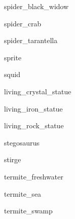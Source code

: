 \documentclass[letterpaper,serif]{module}
\begin{document}
\begin{newmonster}{spider_black_widow}\end{newmonster}

\begin{newmonster}{spider_crab}\end{newmonster}

\begin{newmonster}{spider_tarantella}\end{newmonster}

\begin{newmonster}{sprite}\end{newmonster}

\begin{newmonster}{squid}\end{newmonster}

\begin{newmonster}{living_crystal_statue}\end{newmonster}

\begin{newmonster}{living_iron_statue}\end{newmonster}

\begin{newmonster}{living_rock_statue}\end{newmonster}

\begin{newmonster}{stegosaurus}\end{newmonster}

\begin{newmonster}{stirge}\end{newmonster}

\begin{newmonster}{termite_freshwater}\end{newmonster}

\begin{newmonster}{termite_sea}\end{newmonster}

\begin{newmonster}{termite_swamp}\end{newmonster}
\end{document}
